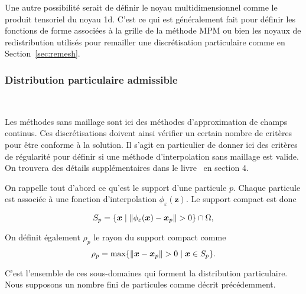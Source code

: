 Une autre possibilité serait de définir le noyau multidimensionnel comme le produit tensoriel du noyau 1d. C'est ce qui est généralement fait pour définir les fonctions de forme associées à la grille de la méthode MPM ou bien les noyaux de redistribution utilisés pour remailler une discrétisation particulaire comme en Section~\ref{sec:remesh}.

\subsubsection{Distribution particulaire admissible}~\label{sec:part_admissible}

Les méthodes sans maillage sont ici des méthodes d'approximation de champs continus. Ces discrétisations doivent ainsi vérifier un certain nombre de critères pour être conforme à la solution. Il s'agit en particulier de donner ici des critères de régularité pour définir si une méthode d'interpolation sans maillage est valide. On trouvera des détails supplémentaires dans le livre~\cite{s_li_meshfree_2004} en section 4.

On rappelle tout d'abord ce qu'est le support d'une particule $p$. Chaque particule est associée à une fonction d'interpolation $\phi_\varepsilon(\bm{z})$. Le support compact est donc

\begin{equation*}
    S_p = \{\bm{x} \mid \| \phi_\varepsilon (\bm{x}) - \bm{x}_p \| > 0\} \cap \Omega,
\end{equation*}

On définit également $\rho_p$ le rayon du support compact comme
\begin{equation*}
    \rho_p =  \max \{\| \bm{x} - \bm{x}_p \| > 0 \mid \bm{x} \in S_p\}.
\end{equation*}

C'est l'ensemble de ces sous-domaines qui forment la distribution particulaire. Nous supposons un nombre fini de particules comme décrit précédemment.%

